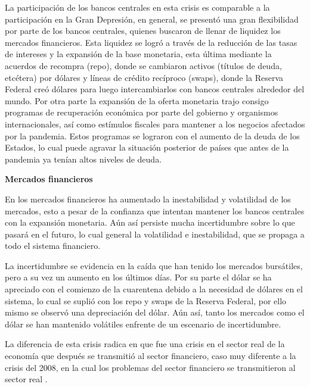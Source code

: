 La participación de los bancos centrales en esta crisis es comparable a la participación en la Gran Depresión, en general, se presentó una gran flexibilidad por parte de los bancos centrales, quienes buscaron de llenar de liquidez los mercados financieros.
Esta liquidez se logró a través de la reducción de las tasas de intereses y la expansión de la base monetaria, esta última mediante la acuerdos de recompra (repo), donde se cambiaron activos (títulos de deuda, etcétera) por dólares y líneas de crédito recíproco (swaps), donde la Reserva Federal creó dólares para luego intercambiarlos con bancos centrales alrededor del mundo.
Por otra parte la expansión de la oferta monetaria trajo consigo programas de recuperación económica por parte del gobierno y organismos internacionales, así como estímulos fiscales para mantener a los negocios afectados por la pandemia. Estos programas se lograron con el aumento de la deuda de los Estados, lo cual puede agravar la situación posterior de países que antes de la pandemia ya tenían altos niveles de deuda.

\textbf{Mercados financieros}

En los mercados financieros ha aumentado la inestabilidad y volatilidad de los mercados, esto a pesar de la confianza que intentan mantener los bancos centrales con la expansión monetaria.
Aún así persiste mucha incertidumbre sobre lo que pasará en el futuro, lo cual general la volatilidad e inestabilidad, que se propaga a todo el sistema financiero.

La incertidumbre se evidencia en la caída que han tenido los mercados bursátiles, pero a su vez un aumento en los últimos días. Por su parte el dólar se ha apreciado con el comienzo de la cuarentena debido a la necesidad de dólares en el sistema, lo cual se suplió con los repo y swaps de la Reserva Federal, por ello mismo se observó una depreciación del dólar. Aún así, tanto los mercados como el dólar se han mantenido volátiles enfrente de un escenario de incertidumbre.

La diferencia de esta crisis radica en que fue una crisis en el sector real de la economía que después se transmitió al sector financiero, caso muy diferente a la crisis del 2008, en la cual los problemas del sector financiero se transmitieron al sector real \cite{CEPALCovid}.
